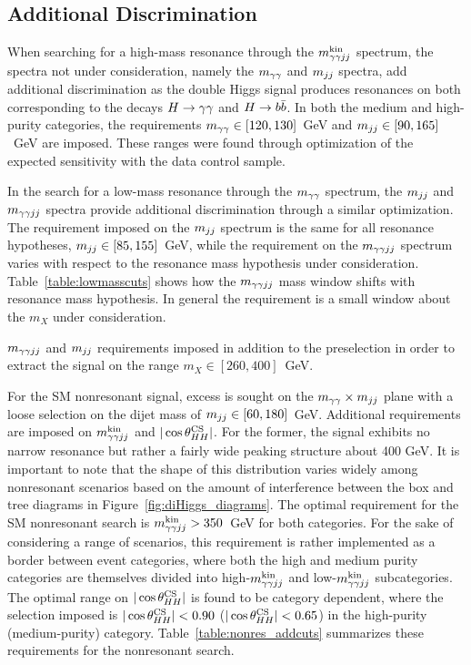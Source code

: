 \subsection{Additional Discrimination\label{subsec:add_discrimination}}

When searching for a high-mass resonance through the $m_{\gamma\gamma jj}^{\rm kin}$ spectrum, the spectra not under
consideration, namely the $m_{\gamma\gamma}$ and $m_{jj}$ spectra, add additional discrimination as the double Higgs
signal produces resonances on both corresponding to the decays $H\to\gamma\gamma$ and $H\to b\bar{b}$. In both
the medium and high-purity categories,
the requirements $m_{\gamma\gamma} \in [120, 130]$~GeV and $m_{jj} \in [90, 165]$~GeV
are imposed.
These ranges were found through optimization of the expected sensitivity with the data control sample.

In the search for a low-mass resonance through the $m_{\gamma\gamma}$ spectrum, the $m_{jj}$ and $m_{\gamma\gamma jj}$ spectra
provide additional discrimination through a similar optimization. The requirement imposed
on the $m_{jj}$ spectrum is the same for all resonance hypotheses, $m_{jj} \in [85,155]$~GeV, while the
requirement on the $m_{\gamma\gamma jj}$ spectrum varies with respect to the resonance mass hypothesis
under consideration.
Table~\ref{table:lowmasscuts} shows how the $m_{\gamma\gamma jj}$ mass window shifts with resonance mass hypothesis.
In general the requirement is a small window about the $m_X$ under consideration.

\begin{table}[ht]
  \centering
  \renewcommand{\arraystretch}{1.4}
  \caption{$m_{\gamma\gamma jj}$ and $m_{jj}$ requirements imposed in addition to the preselection in order to extract
the signal on the range $m_X \in [260, 400]$~GeV.}
  
  \label{table:lowmasscuts}
\end{table}

For the SM nonresonant signal, excess is sought on the $m_{\gamma\gamma} \times m_{jj}$ plane with a
loose selection on the dijet mass of $m_{jj} \in [60, 180]$~GeV.
Additional requirements are imposed on $m_{\gamma\gamma jj}^{\rm kin}$ and $|\cos {\theta^{\rm CS}_{HH}}|$. For the former, the signal
exhibits no narrow resonance but rather a fairly wide peaking structure about 400 GeV. It is important
to note that the shape of this distribution varies widely among nonresonant scenarios based on
the amount of interference between the box and tree diagrams in Figure~\ref{fig:diHiggs_diagrams}.
The optimal requirement for the SM nonresonant search is $m_{\gamma\gamma jj}^{\rm kin} > 350$~GeV for both categories.
For the sake of considering a range of scenarios, this requirement is rather implemented as a border
between event categories, where both the high and medium purity categories are themselves divided into
high-$m_{\gamma\gamma jj}^{\rm kin}$ and low-$m_{\gamma\gamma jj}^{\rm kin}$ subcategories.
The optimal range on $|\cos {\theta^{\rm CS}_{HH}}|$ is found to be category dependent, where the selection imposed
is $|\cos {\theta^{\rm CS}_{HH}}| < 0.90$ ($|\cos {\theta^{\rm CS}_{HH}}| < 0.65$) in the high-purity (medium-purity) category.
Table~\ref{table:nonres_addcuts} summarizes these requirements for the nonresonant search.

